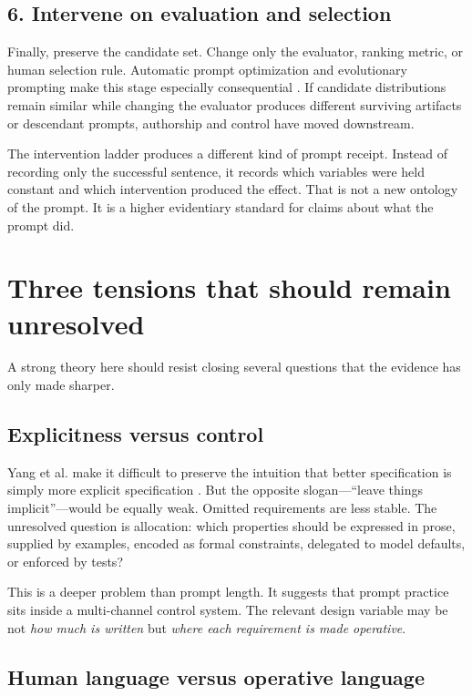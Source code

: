 \documentclass[11pt]{article}
\begin{document}
\subsection{6. Intervene on evaluation and selection}

Finally, preserve the candidate set. Change only the evaluator, ranking metric, or human selection rule. Automatic prompt optimization and evolutionary prompting make this stage especially consequential \citep{Pryzant2023APO,Fernando2023Promptbreeder}. If candidate distributions remain similar while changing the evaluator produces different surviving artifacts or descendant prompts, authorship and control have moved downstream.

The intervention ladder produces a different kind of prompt receipt. Instead of recording only the successful sentence, it records which variables were held constant and which intervention produced the effect. That is not a new ontology of the prompt. It is a higher evidentiary standard for claims about what the prompt did.

\section{Three tensions that should remain unresolved}

A strong theory here should resist closing several questions that the evidence has only made sharper.

\subsection{Explicitness versus control}

Yang et al. make it difficult to preserve the intuition that better specification is simply more explicit specification \citep{Yang2025PromptsDontSay}. But the opposite slogan---``leave things implicit''---would be equally weak. Omitted requirements are less stable. The unresolved question is allocation: which properties should be expressed in prose, supplied by examples, encoded as formal constraints, delegated to model defaults, or enforced by tests?

This is a deeper problem than prompt length. It suggests that prompt practice sits inside a multi-channel control system. The relevant design variable may be not \emph{how much is written} but \emph{where each requirement is made operative}.

\subsection{Human language versus operative language}
\end{document}
